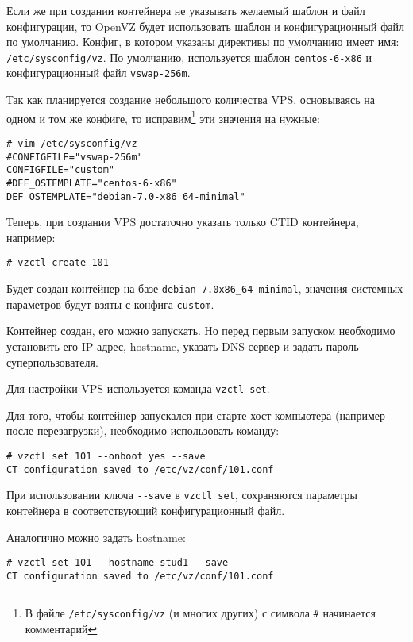 Если же при создании контейнера не указывать желаемый шаблон и файл конфигурации, то OpenVZ будет использовать шаблон и конфигурационный файл по умолчанию.
Конфиг, в котором указаны директивы по умолчанию имеет имя: \texttt{/etc/sysconfig/vz}.
По умолчанию, используется шаблон \texttt{centos-6-x86} и конфигурационный файл \texttt{vswap-256m}.

Так как планируется создание небольшого количества VPS, основываясь на одном и том же конфиге, то исправим\footnote{В файле \texttt{/etc/sysconfig/vz} (и многих других) с символа \texttt{\#} начинается комментарий} эти значения на нужные:
\begin{lstlisting}
# vim /etc/sysconfig/vz
#CONFIGFILE="vswap-256m"
CONFIGFILE="custom"
#DEF_OSTEMPLATE="centos-6-x86"
DEF_OSTEMPLATE="debian-7.0-x86_64-minimal"
\end{lstlisting}

Теперь, при создании VPS достаточно указать только CTID контейнера, например:
\begin{lstlisting}
# vzctl create 101
\end{lstlisting}

Будет создан контейнер на базе \texttt{debian-7.0x86\_64-minimal}, значения системных параметров будут взяты с конфига \texttt{custom}.

Контейнер создан, его можно запускать.
Но перед первым запуском необходимо установить его IP адрес, hostname, указать DNS сервер и задать пароль суперпользователя.

Для настройки VPS используется команда \texttt{vzctl set}.

Для того, чтобы контейнер запускался при старте хост-компьютера (например после перезагрузки), необходимо использовать команду:
\begin{lstlisting}
# vzctl set 101 --onboot yes --save
CT configuration saved to /etc/vz/conf/101.conf
\end{lstlisting}

При использовании ключа \texttt{-{}-save} в \texttt{vzctl set}, сохраняются параметры контейнера в соответствующий конфигурационный файл.

Аналогично можно задать hostname:
\begin{lstlisting}
# vzctl set 101 --hostname stud1 --save
CT configuration saved to /etc/vz/conf/101.conf
\end{lstlisting}

